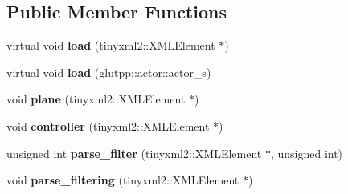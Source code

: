 \subsection*{\-Public \-Member \-Functions}
\begin{DoxyCompactItemize}
\item 
\hypertarget{classglutpp_1_1actor_1_1raw_acc3b39cd36f288b408ec8ba8dbc31789}{virtual void {\bfseries load} (tinyxml2\-::\-X\-M\-L\-Element $\ast$)}\label{classglutpp_1_1actor_1_1raw_acc3b39cd36f288b408ec8ba8dbc31789}

\item 
\hypertarget{classglutpp_1_1actor_1_1raw_ac4f1df0289c70484f4ed9737757ae853}{virtual void {\bfseries load} (glutpp\-::actor\-::actor\-\_\-s)}\label{classglutpp_1_1actor_1_1raw_ac4f1df0289c70484f4ed9737757ae853}

\item 
\hypertarget{classglutpp_1_1actor_1_1raw_ab7baf7c3e1a7b3d52c966179b4839d55}{void {\bfseries plane} (tinyxml2\-::\-X\-M\-L\-Element $\ast$)}\label{classglutpp_1_1actor_1_1raw_ab7baf7c3e1a7b3d52c966179b4839d55}

\item 
\hypertarget{classglutpp_1_1actor_1_1raw_a6a47b4b67928acb78dad4e95a6d644bd}{void {\bfseries controller} (tinyxml2\-::\-X\-M\-L\-Element $\ast$)}\label{classglutpp_1_1actor_1_1raw_a6a47b4b67928acb78dad4e95a6d644bd}

\item 
\hypertarget{classglutpp_1_1actor_1_1raw_a9f875bd2b16aed06c8f117b56ffb8ddc}{unsigned int {\bfseries parse\-\_\-filter} (tinyxml2\-::\-X\-M\-L\-Element $\ast$, unsigned int)}\label{classglutpp_1_1actor_1_1raw_a9f875bd2b16aed06c8f117b56ffb8ddc}

\item 
\hypertarget{classglutpp_1_1actor_1_1raw_a8622c50f790989b296b5666571b7e8a2}{void {\bfseries parse\-\_\-filtering} (tinyxml2\-::\-X\-M\-L\-Element $\ast$)}\label{classglutpp_1_1actor_1_1raw_a8622c50f790989b296b5666571b7e8a2}

\end{DoxyCompactItemize}
